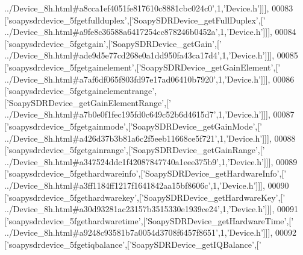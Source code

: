 \begin{DoxyCode}
{      ../Device\_8h.html#a8cca1ef4051fe817610c8881cbc024c0'},1,\textcolor{stringliteral}{'Device.h'}]]],
00083   [\textcolor{stringliteral}{'soapysdrdevice\_5fgetfullduplex'},[\textcolor{stringliteral}{'SoapySDRDevice\_getFullDuplex'},[\textcolor{stringliteral}{'
      ../Device\_8h.html#a9fe8c36588a6417254cc878246b0452a'},1,\textcolor{stringliteral}{'Device.h'}]]],
00084   [\textcolor{stringliteral}{'soapysdrdevice\_5fgetgain'},[\textcolor{stringliteral}{'SoapySDRDevice\_getGain'},[\textcolor{stringliteral}{'
      ../Device\_8h.html#ade9d5e77cd268e0a1dd950fa43ca17d4'},1,\textcolor{stringliteral}{'Device.h'}]]],
00085   [\textcolor{stringliteral}{'soapysdrdevice\_5fgetgainelement'},[\textcolor{stringliteral}{'SoapySDRDevice\_getGainElement'},[\textcolor{stringliteral}{'
      ../Device\_8h.html#a7af6df065f803fd97e17ad06410b7920'},1,\textcolor{stringliteral}{'Device.h'}]]],
00086   [\textcolor{stringliteral}{'soapysdrdevice\_5fgetgainelementrange'},[\textcolor{stringliteral}{'SoapySDRDevice\_getGainElementRange'},[\textcolor{stringliteral}{'
      ../Device\_8h.html#a7b0e0f1fec195fd0c649c52b6d4615d7'},1,\textcolor{stringliteral}{'Device.h'}]]],
00087   [\textcolor{stringliteral}{'soapysdrdevice\_5fgetgainmode'},[\textcolor{stringliteral}{'SoapySDRDevice\_getGainMode'},[\textcolor{stringliteral}{'
      ../Device\_8h.html#a426d37b3b81a6c2f5eeb11668ce5f721'},1,\textcolor{stringliteral}{'Device.h'}]]],
00088   [\textcolor{stringliteral}{'soapysdrdevice\_5fgetgainrange'},[\textcolor{stringliteral}{'SoapySDRDevice\_getGainRange'},[\textcolor{stringliteral}{'
      ../Device\_8h.html#a347524ddc1f42087847740a1eee375b9'},1,\textcolor{stringliteral}{'Device.h'}]]],
00089   [\textcolor{stringliteral}{'soapysdrdevice\_5fgethardwareinfo'},[\textcolor{stringliteral}{'SoapySDRDevice\_getHardwareInfo'},[\textcolor{stringliteral}{'
      ../Device\_8h.html#a3ff1184ff1217f1641842aa15bf8606c'},1,\textcolor{stringliteral}{'Device.h'}]]],
00090   [\textcolor{stringliteral}{'soapysdrdevice\_5fgethardwarekey'},[\textcolor{stringliteral}{'SoapySDRDevice\_getHardwareKey'},[\textcolor{stringliteral}{'
      ../Device\_8h.html#a30d93281ac23157b3515330e1939ce24'},1,\textcolor{stringliteral}{'Device.h'}]]],
00091   [\textcolor{stringliteral}{'soapysdrdevice\_5fgethardwaretime'},[\textcolor{stringliteral}{'SoapySDRDevice\_getHardwareTime'},[\textcolor{stringliteral}{'
      ../Device\_8h.html#a9248c93581b7a0054d3708f6457f8651'},1,\textcolor{stringliteral}{'Device.h'}]]],
00092   [\textcolor{stringliteral}{'soapysdrdevice\_5fgetiqbalance'},[\textcolor{stringliteral}{'SoapySDRDevice\_getIQBalance'},[\textcolor{stringliteral}{'
}
\end{DoxyCode}
